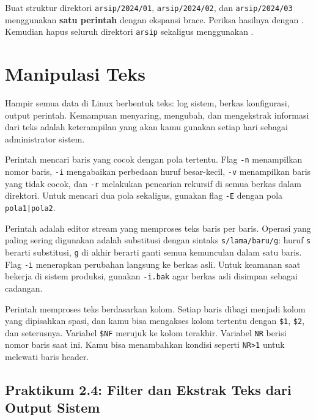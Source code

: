 \begin{challengebox}
Buat struktur direktori \texttt{arsip/2024/01}, \texttt{arsip/2024/02}, dan \texttt{arsip/2024/03} menggunakan \textbf{satu perintah}  dengan ekspansi brace. Periksa hasilnya dengan . Kemudian hapus seluruh direktori \texttt{arsip} sekaligus menggunakan .
\end{challengebox}

\section{Manipulasi Teks}
\label{sec:text-manipulation}

Hampir semua data di Linux berbentuk teks: log sistem, berkas konfigurasi, output perintah. Kemampuan menyaring, mengubah, dan mengekstrak informasi dari teks adalah keterampilan yang akan kamu gunakan setiap hari sebagai administrator sistem.

Perintah  mencari baris yang cocok dengan pola tertentu. Flag \texttt{-n} menampilkan nomor baris, \texttt{-i} mengabaikan perbedaan huruf besar-kecil, \texttt{-v} menampilkan baris yang tidak cocok, dan \texttt{-r} melakukan pencarian rekursif di semua berkas dalam direktori. Untuk mencari dua pola sekaligus, gunakan flag \texttt{-E} dengan pola \texttt{pola1|pola2}.

Perintah  adalah editor stream yang memproses teks baris per baris. Operasi yang paling sering digunakan adalah substitusi dengan sintaks \texttt{s/lama/baru/g}: huruf \texttt{s} berarti substitusi, \texttt{g} di akhir berarti ganti semua kemunculan dalam satu baris. Flag \texttt{-i} menerapkan perubahan langsung ke berkas asli. Untuk keamanan saat bekerja di sistem produksi, gunakan \texttt{-i.bak} agar berkas asli disimpan sebagai cadangan.

Perintah  memproses teks berdasarkan kolom. Setiap baris dibagi menjadi kolom yang dipisahkan spasi, dan kamu bisa mengakses kolom tertentu dengan \texttt{\$1}, \texttt{\$2}, dan seterusnya. Variabel \texttt{\$NF} merujuk ke kolom terakhir. Variabel \texttt{NR} berisi nomor baris saat ini. Kamu bisa menambahkan kondisi seperti \texttt{NR>1} untuk melewati baris header.

\subsection*{Praktikum 2.4: Filter dan Ekstrak Teks dari Output Sistem}

